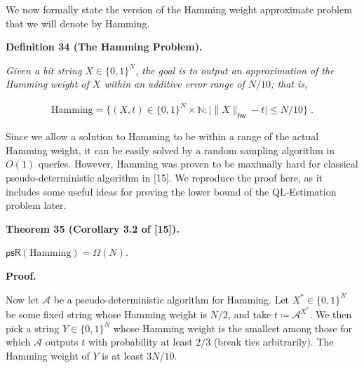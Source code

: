 We now formally state the version of the Hamming weight approximate problem that we will denote by Hamming.\par





\par\medskip\noindent\textbf{
\textbf{Definition 34}\textbf{ }(The Hamming Problem)\textbf{.}
}\par



\emph{Given a bit string $X\in\{0,1\}^{N}$, the goal is to output an approximation of the Hamming weight of $X$ within an additive error range of $N/10$; that is,}\par


\[\begin{gathered}
\displaystyle{\text{Hamming}}=\{(X,t)\in\{0,1\}^{N}\times\mathbb{N}:\big|\|X\|_{\mathsf{hw}}-t\big|\leq N/10\}\;.
\end{gathered}\]






Since we allow a solution to Hamming to be within a range of the actual Hamming weight, it can be easily solved by a random sampling algorithm in $O(1)$ queries.
However, Hamming was proven to be maximally hard for classical pseudo-deterministic algorithm in [15]. We reproduce the proof here, as it includes some useful ideas for proving the lower bound of the QL-Estimation problem later.\par





\par\medskip\noindent\textbf{
\textbf{Theorem 35}\textbf{ }(Corollary 3.2 of [15])\textbf{.}
}\par



$\mathsf{psR}({\text{Hamming}})=\Omega(N)$\emph{.}\par







\par\medskip\noindent\textbf{Proof.}\par




Now let $\mathcal{A}$ be a pseudo-deterministic algorithm for Hamming.
Let $X^{*}\in\{0,1\}^{N}$ be some fixed string whose Hamming weight is $N/2$, and take
$t\coloneqq\mathcal{A}^{X^{*}}$. We then pick a string $Y\in\{0,1\}^{N}$ whose Hamming weight is the smallest among those for which $\mathcal{A}$ outputs $t$ with probability at least $2/3$ (break ties arbitrarily).
The Hamming weight of $Y$ is at least $3N/10$.\par




